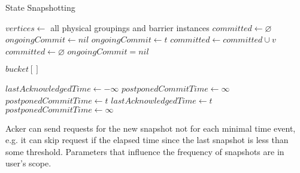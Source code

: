 \begin{algorithm}
\caption{State Snapshotting}
\label{state-snapshoting}
  \begin{algorithmic}
      \State $vertices \gets$ all physical groupings and barrier instances
      \State $committed \gets \varnothing$
      \State $ongoingCommit \gets nil$
      \State
         
            \State {}
          \EndFor
          \State $ongoingCommit \gets t$
        \EndIf
      \EndEvent
        \State $committed \gets committed \cup v$
          \State {} 
          \State $committed \gets \varnothing$
          \State $ongoingCommit = nil$
        \EndIf
      \EndEvent
    \EndProcess

      \State $bucket[]$ 
      \State
        \State {} 
        \State {}
        \State {}
      \EndEvent
    \EndProcess

      \State $lastAcknowledgedTime \gets -\infty$ 
      \State $postponedCommitTime \gets \infty$
      \State
          \State {}
        \Else
          \State $postponedCommitTime \gets t$
        \EndIf
      \EndEvent
        \State $lastAcknowledgedTime \gets t$
          \State {}
          \State $postponedCommitTime \gets \infty$
        \EndIf
      \EndEvent
    \EndProcess
  \end{algorithmic}
\end{algorithm}

Acker can send requests for the new snapshot not for each minimal time event, e.g. it can skip request if the elapsed time since the last snapshot is less than some threshold. Parameters that influence the frequency of snapshots are in user's scope.

